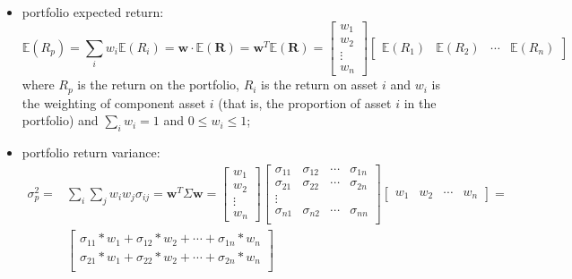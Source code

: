 \begin{itemize}
\tightlist
\item
  portfolio expected return: 
  \begin{equation} 
  	\mathbb{E}(R_{p}) = \sum _{i}w_{i} \mathbb{E}(R_{i}) = \mathbf{w}\cdot \mathbb{E}(\mathbf{R}) = \mathbf{w}^T \mathbb{E}(\mathbf{R})=
      \begin{bmatrix}
      w_1 \\ 
      w_2 \\ 
      \vdots \\
      w_n
      \end{bmatrix}
      \begin{bmatrix}
      \mathbb{E}(R_1) & \mathbb{E}(R_2) & \cdots & \mathbb{E}(R_n)
      \end{bmatrix}
  \end{equation} 
  where \(R_{p}\) is the return on the portfolio, \(R_{i}\) is the return on asset \(i\) and \(w_{i}\) is the weighting of component asset \(i\) (that is, the proportion of asset \(i\) in the portfolio) and \(\sum_{i}w_i = 1\) and \(0 \le w_i \le 1\);
\item
  portfolio return variance:
  \begin{equation}
  \begin{aligned}
  \sigma _{p}^{2} = &\sum _{i}\sum _{j}w_{i}w_{j}\sigma _{ij} = \mathbf{w}^T\Sigma\mathbf{w} =
  \begin{bmatrix}
  w_1 \\ 
  w_2 \\ 
  \vdots \\
  w_n
  \end{bmatrix}
  \begin{bmatrix}
  \sigma_{11} & \sigma_{12} & \cdots & \sigma_{1n} \\
  \sigma_{21} & \sigma_{22} & \cdots & \sigma_{2n} \\
  \vdots & & \\
  \sigma_{n1} & \sigma_{n2} & \cdots & \sigma_{nn} \\
  \end{bmatrix}
  \begin{bmatrix}
  w_1 & w_2 & \cdots & w_n
  \end{bmatrix} =\\ 
  &\begin{bmatrix}
  \sigma_{11} *w_1 + \sigma_{12} *w_2 + \cdots + \sigma_{1n}*w_n \\
  \sigma_{21} *w_1 + \sigma_{22} *w_2  +\cdots + \sigma_{2n}*w_n \\

\end{bmatrix}
\end{aligned}
\end{equation}
\end{itemize}
